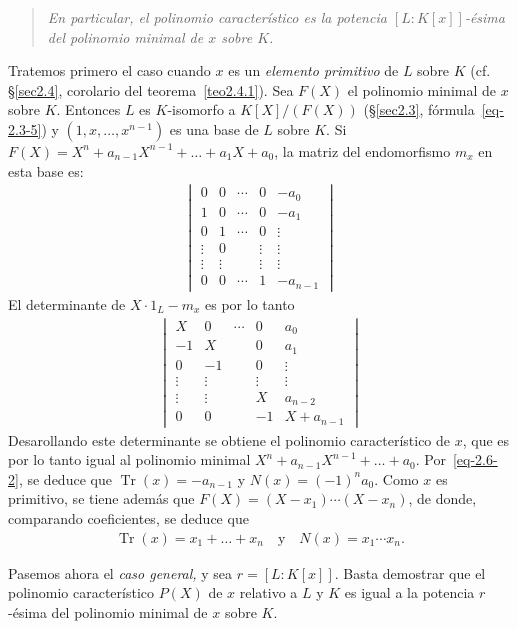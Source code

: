 \documentclass[bibtotoc,leqno,spanish]{amsbook}
\DeclareMathOperator{\Tr}{Tr}
\numberwithin{equation}{section}
\newenvironment{comm}%
	{\begin{quotation}\itshape}
	{\end{quotation}}
\theoremstyle{note}
\theoremstyle{note}
\theoremstyle{rem}
\numberwithin{theorem}{section}
\numberwithin{proposition}{section}
\numberwithin{definition}{section}
\numberwithin{lemma}{section}
\numberwithin{corollary}{section}
\numberwithin{example}{section}
\numberwithin{footnote}{section}%
\begin{document}
\begin{comm}
En particular, el polinomio caracter\'istico es la potencia $[L:K[x]]$-\'esima del
polinomio minimal de $x$
sobre $K$.
\end{comm}

Tratemos primero el caso cuando $x$ es un {\em elemento primitivo} de $L$ sobre $K$
(cf. \S\ref{sec2.4}, corolario del teorema~\ref{teo2.4.1}).
Sea $F(X)$ el polinomio minimal de $x$ sobre $K$. Entonces $L$ es $K$-isomorfo a
$K[X]/(F(X))$ (\S\ref{sec2.3}, f\'ormula~\eqref{eq-2.3-5})
y $(1,x,\dots,x^{n-1})$ es una base de $L$ sobre $K$. Si
$F(X) = X^{n}+a_{n-1}X^{n-1}+\dots+a_{1}X+a_{0}$,
la matriz del endomorfismo $m_{x}$ en esta base es:
\begin{gather*}
\begin{vmatrix}
0 & 0 & \cdots & 0 & -a_{0}\\
1 & 0 & \cdots & 0 & -a_{1}\\
0 & 1 & \cdots & 0 & \vdots\\
\vdots & 0 & & \vdots & \vdots\\
\vdots & \vdots & & \vdots & \vdots\\
0 & 0 & \cdots & 1 & -a_{n-1}
\end{vmatrix}
\end{gather*}
El determinante de $X\cdot 1_{L}-m_{x}$ es por lo tanto
\begin{gather*}
\begin{vmatrix}
X & 0 & \cdots & 0 & a_{0}\\
-1 & X & & 0 & a_{1}\\
0 & -1 & & 0 & \vdots\\
\vdots & \vdots & & \vdots & \vdots\\
\vdots & \vdots & & X & a_{n-2}\\
0 & 0 & & -1 & X+a_{n-1}
\end{vmatrix}
\end{gather*}
Desarollando este determinante se obtiene el polinomio caracter\'istico de $x$, que es por lo tanto igual
al polinomio minimal $X^{n}+a_{n-1}X^{n-1}+\dots+a_{0}$. Por~\eqref{eq-2.6-2}, se deduce que $\Tr(x) = -a_{n-1}$
y $N(x) = (-1)^{n}a_{0}$. Como $x$ es primitivo, se tiene adem\'as que $F(X) = (X-x_{1})\cdots(X-x_{n})$, de
donde, comparando coeficientes, se deduce que
\begin{gather*}
\Tr(x) = x_{1}+\dots+x_{n}\quad\text{y}\quad N(x) = x_{1}\cdots x_{n}.
\end{gather*}

Pasemos ahora el {\em caso general,} y sea $r = [L:K[x]]$. Basta demostrar que el polinomio caracter\'istico
$P(X)$ de $x$ relativo a $L$ y $K$ es igual a la potencia $r$-\'esima del polinomio minimal de $x$ sobre $K$.
\end{document}
